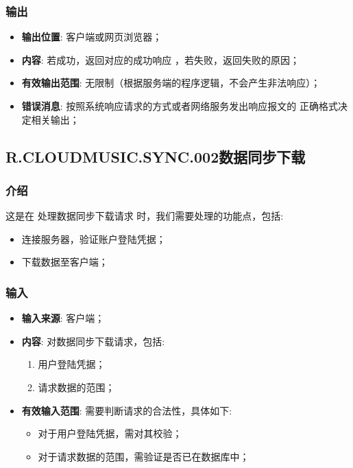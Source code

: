 \subsubsection{输出}
\begin{itemize}
	\item \textbf{输出位置}: 客户端或网页浏览器；
	\item \textbf{内容}: 若成功，返回对应的成功响应 ，若失败，返回失败的原因；
	\item \textbf{有效输出范围}: 无限制（根据服务端的程序逻辑，不会产生非法响应）；
	\item \textbf{错误消息}: 按照系统响应请求的方式或者网络服务发出响应报文的
		正确格式决定相关输出；
\end{itemize}

\subsection{R.CLOUDMUSIC.SYNC.002数据同步下载}
\subsubsection{介绍}
	这是在 处理数据同步下载请求 时，我们需要处理的功能点，包括: 
	\begin{itemize}
		\item 连接服务器，验证账户登陆凭据；
		\item 下载数据至客户端；
	\end{itemize}
\subsubsection{输入}
	\begin{itemize}
		\item \textbf{输入来源}: 客户端；
		\item \textbf{内容}: 对数据同步下载请求，包括: 
		\begin{enumerate}
			\item 用户登陆凭据；
			\item 请求数据的范围；
		\end{enumerate}
		\item \textbf{有效输入范围}: 需要判断请求的合法性，具体如下: 
		\begin{itemize}
			\item 对于用户登陆凭据，需对其校验； 
			\item 对于请求数据的范围，需验证是否已在数据库中； 
		\end{itemize}
	\end{itemize}
